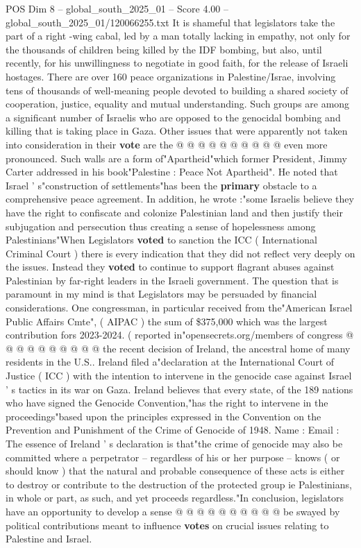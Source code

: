\begin{textsample}{POS Dim 8 – global\_south\_2025\_01 – Score 4.00 – global\_south\_2025\_01/120066255.txt}
It is shameful that legislators take the part of a right -wing cabal, led by a man totally lacking in empathy, not only for the thousands of children being killed by the IDF bombing, but also, until recently, for his unwillingness to negotiate in good faith, for the release of Israeli hostages.
There are over 160 peace organizations in Palestine/Israe, involving tens of thousands of well-meaning people devoted to building a shared society of cooperation, justice, equality and mutual understanding.
Such groups are among a significant number of Israelis who are opposed to the genocidal bombing and killing that is taking place in Gaza.
Other issues that were apparently not taken into consideration in their \textbf{vote} are the @ @ @ @ @ @ @ @ @ @ even more pronounced.
Such walls are a form of"Apartheid"which former President, Jimmy Carter addressed in his book"Palestine : Peace Not Apartheid".
He noted that Israel ' s"construction of settlements"has been the \textbf{primary} obstacle to a comprehensive peace agreement.
In addition, he wrote :"some Israelis believe they have the right to confiscate and colonize Palestinian land and then justify their subjugation and persecution thus creating a sense of hopelessness among Palestinians"When Legislators \textbf{voted} to sanction the ICC ( International Criminal Court ) there is every indication that they did not reflect very deeply on the issues.
Instead they \textbf{voted} to continue to support flagrant abuses against Palestinian by far-right leaders in the Israeli government.
The question that is paramount in my mind is that Legislators may be persuaded by financial considerations.
One congressman, in particular received from the"American Israel Public Affairs Cmte", ( AIPAC ) the sum of \$375,000 which was the largest contribution fors 2023-2024. ( reported in"opensecrets.org/members of congress @ @ @ @ @ @ @ @ @ @ the recent decision of Ireland, the ancestral home of many residents in the U.S..
Ireland filed a"declaration at the International Court of Justice ( ICC ) with the intention to intervene in the genocide case against Israel ' s tactics in its war on Gaza.
Ireland believes that every state, of the 189 nations who have signed the Genocide Convention,"has the right to intervene in the proceedings"based upon the principles expressed in the Convention on the Prevention and Punishment of the Crime of Genocide of 1948.
Name : Email : The essence of Ireland ' s declaration is that"the crime of genocide may also be committed where a perpetrator -- regardless of his or her purpose -- knows ( or should know ) that the natural and probable consequence of these acts is either to destroy or contribute to the destruction of the protected group ie Palestinians, in whole or part, as such, and yet proceeds regardless."In conclusion, legislators have an opportunity to develop a sense @ @ @ @ @ @ @ @ @ @ be swayed by political contributions meant to influence \textbf{votes} on crucial issues relating to Palestine and Israel.

\end{textsample}
